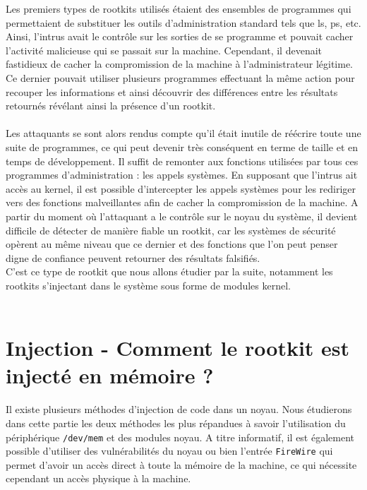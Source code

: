 \documentclass[11pt]{article}
\begin{document}
	Les premiers types de rootkits utilisés étaient des ensembles de programmes qui permettaient de substituer les outils d'administration standard tels que ls, ps, etc. Ainsi, l'intrus avait le contrôle sur les sorties de se programme et pouvait cacher l'activité malicieuse qui se passait sur la machine. Cependant, il devenait fastidieux de cacher la compromission de la machine à l'administrateur légitime. Ce dernier pouvait utiliser plusieurs programmes effectuant la même action pour recouper les informations et ainsi découvrir des différences entre les résultats retournés révélant ainsi la présence d'un rootkit.\\
	\\
	
	Les attaquants se sont alors rendus compte qu'il était inutile de réécrire toute une suite de programmes, ce qui peut devenir très conséquent en terme de taille et en temps de développement. Il suffit de remonter aux fonctions utilisées par tous ces programmes d'administration : les appels systèmes. En supposant que l'intrus ait accès au kernel, il est possible d'intercepter les appels systèmes pour les rediriger vers des fonctions malveillantes afin de cacher la compromission de la machine. A partir du moment où l'attaquant a le contrôle sur le noyau du système, il devient difficile de détecter de manière fiable un rootkit, car les systèmes de sécurité opèrent au même niveau que ce dernier et des fonctions que l'on peut penser digne de confiance peuvent retourner des résultats falsifiés. \\
	C'est ce type de rootkit que nous allons étudier par la suite, notamment les rootkits s'injectant dans le système sous forme de modules kernel.\\
	\\



\section{Injection - Comment le rootkit est injecté en mémoire ?}

Il existe plusieurs méthodes d'injection de code dans un noyau. Nous étudierons dans cette partie les deux méthodes les plus répandues à savoir l'utilisation du périphérique \texttt{/dev/mem} et des modules noyau. A titre informatif, il est également possible d'utiliser des vulnérabilités du noyau ou bien l'entrée \texttt{FireWire} qui permet d'avoir un accès direct à toute la mémoire de la machine, ce qui nécessite cependant un accès physique à la machine.\\
\end{document}
